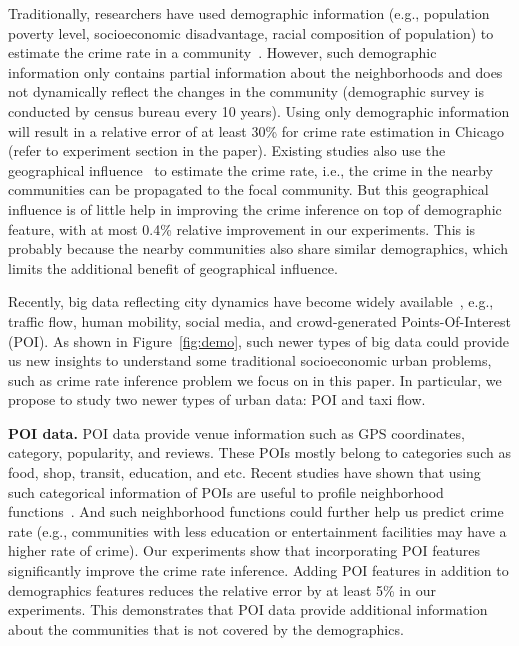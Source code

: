 Traditionally, researchers have used demographic information (e.g., population poverty level, socioeconomic disadvantage, racial composition of population) to estimate the crime rate in a community~\cite{GrSa09}. However,  such demographic information only contains partial information about the neighborhoods and does not dynamically reflect the changes in the community (demographic survey is conducted by census bureau every 10 years). Using only demographic information will result in a relative error of at least 30\% for crime rate estimation in Chicago (refer to experiment section in the paper). Existing studies also use the geographical influence~\cite{Ans02} to estimate the crime rate, i.e., the crime in the nearby communities can be propagated to the focal community. But this geographical influence is of little help in improving the crime inference on top of demographic feature, with at most 0.4\% relative improvement in our experiments. This is probably because the nearby communities also share similar demographics, which limits the additional benefit of geographical influence.



Recently, big data reflecting city dynamics have become widely available~\cite{ZCWY14}, e.g., traffic flow, human mobility, social media, and crowd-generated Points-Of-Interest (POI). As shown in Figure~\ref{fig:demo}, such newer types of big data could provide us new insights to understand some traditional socioeconomic urban problems, such as crime rate inference problem we focus on in this paper. In particular, we propose to study two newer types of urban data: POI and taxi flow. 

\textbf{POI data.} POI data provide venue information such as GPS coordinates, category, popularity, and reviews. These POIs mostly belong to categories such as food, shop, transit, education, and etc. Recent studies have shown that using such categorical information of POIs are useful to profile neighborhood functions~\cite{YZX12}. And such neighborhood functions could further help us predict crime rate (e.g., communities with less education or entertainment facilities may have a higher rate of crime). Our experiments show that incorporating POI features   significantly improve the crime rate inference. Adding POI features in addition to demographics features reduces the relative error by at least 5\% in our experiments. This demonstrates that POI data provide additional information about the communities that is not covered by the demographics.

